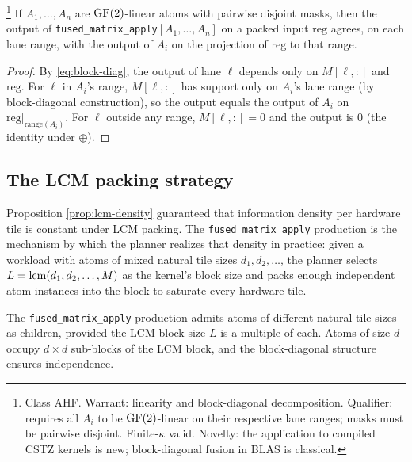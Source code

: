 \begin{proposition}
  \label{prop:fused-correctness}
  \footnote{Class \textsf{AHF}. Warrant: linearity and
  block-diagonal decomposition. Qualifier: requires
  all $A_i$ to be $\operatorname{GF}(2)$-linear on their respective
  lane ranges; masks must be pairwise disjoint.
  Finite-$\kappa$ valid. Novelty: the application to
  compiled CSTZ kernels is new; block-diagonal
  fusion in BLAS is classical.}
  If $A_1, \ldots, A_n$ are $\operatorname{GF}(2)$-linear atoms
  with pairwise disjoint masks, then the output of
  \texttt{fused\_matrix\_apply}$[A_1, \ldots, A_n]$ on
  a packed input $\mathrm{reg}$ agrees, on each lane
  range, with the output of $A_i$ on the projection
  of $\mathrm{reg}$ to that range.
\end{proposition}

\begin{proof}
  By \eqref{eq:block-diag}, the output of lane $\ell$
  depends only on $M[\ell, :]$ and $\mathrm{reg}$. For
  $\ell$ in $A_i$'s range, $M[\ell, :]$ has support
  only on $A_i$'s lane range (by block-diagonal
  construction), so the output equals the output of
  $A_i$ on $\mathrm{reg}|_{\text{range}(A_i)}$. For
  $\ell$ outside any range, $M[\ell, :] = 0$ and the
  output is 0 (the identity under $\oplus$).
\end{proof}

\subsection{The LCM packing strategy}

Proposition \ref{prop:lcm-density} guaranteed that
information density per hardware tile is constant
under LCM packing. The \texttt{fused\_matrix\_apply}
production is the mechanism by which the planner
realizes that density in practice: given a workload
with atoms of mixed natural tile sizes $d_1, d_2,
\ldots$, the planner selects $L = \operatorname{lcm}(d_1, d_2,
\ldots, M)$ as the kernel's block size and packs
enough independent atom instances into the block to
saturate every hardware tile.

\begin{corollary}
  \label{cor:heterogeneous}
  The \texttt{fused\_matrix\_apply} production admits
  atoms of different natural tile sizes as children,
  provided the LCM block size $L$ is a multiple of
  each. Atoms of size $d$ occupy $d \times d$
  sub-blocks of the LCM block, and the block-diagonal
  structure ensures independence.
\end{corollary}


